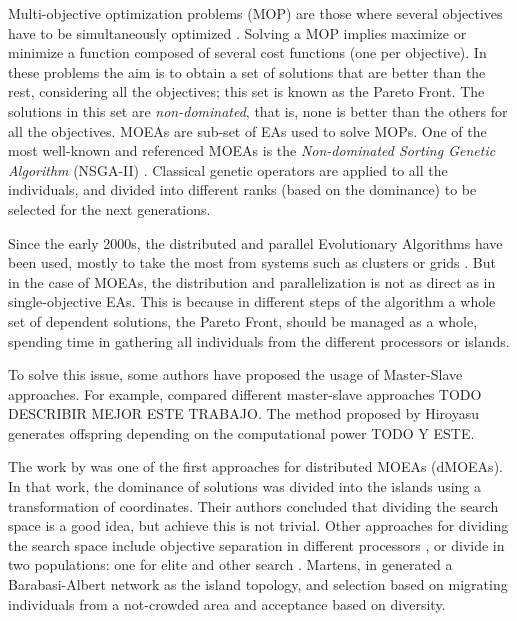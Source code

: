 \documentclass[Afour,sageh,times]{sagej}
\begin{document}
Multi-objective optimization problems (MOP) are those where several objectives have to be simultaneously optimized \cite{Mora13paretobased}. Solving a MOP implies maximize or minimize a function composed of several cost functions (one per objective). In these problems the aim is to obtain a set of solutions that are better than the rest, considering all the objectives; this set is known as the Pareto Front. The solutions in this set are {\em non-dominated}, that is, none is better than the others for all the objectives. MOEAs are sub-set of EAs used to solve MOPs. One of the most well-known and referenced MOEAs \cite{Dorronsoro13superlinear} is the {\em Non-dominated Sorting Genetic Algorithm} (NSGA-II) \cite{Deb00NSGAII}. Classical genetic operators are applied to all the individuals, and divided into different ranks (based on the dominance) to be selected for the next generations.


Since the early 2000s, the distributed and parallel Evolutionary Algorithms have been used, mostly to take the most from systems such as clusters or grids \citep{Talbi08Parallel}. But in the case of MOEAs, the distribution and parallelization is not as direct as in single-objective EAs. This is because in different steps of the algorithm a whole set of dependent solutions, the Pareto Front, should be managed as a whole, spending time in gathering all individuals from the different processors or islands.

To solve this issue, some authors have proposed the usage of Master-Slave approaches. For example,  \cite{Durillo08masterslave} compared different master-slave approaches {\color{red} TODO DESCRIBIR MEJOR ESTE TRABAJO}. The method proposed by Hiroyasu \citep{Hiroyasu07discussion} generates offspring depending on the computational power {\color{red} TODO Y ESTE}.

The work by \cite{Deb03distributed} was one of the first approaches for distributed MOEAs (dMOEAs). In that work, the dominance of solutions was divided into the islands using a transformation of coordinates. Their authors concluded that dividing the search space is a good idea, but achieve this is not trivial. Other approaches for dividing the search space include objective separation in different processors \citep{Xiao03specialized}, or divide in two populations: one for elite and other search \citep{Wang09parallel}. Martens, in \citep{Martens13asynchronous} generated a Barabasi-Albert network as the island topology, and selection based on migrating individuals from a not-crowded area and acceptance based on diversity. 
\end{document}
